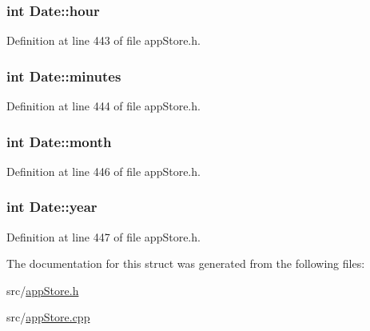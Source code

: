\hypertarget{struct_date_a59f93395dbec8ce9945f2ea091250c42}{
\subsubsection[{hour}]{\setlength{\rightskip}{0pt plus 5cm}int Date\-::hour}}\label{struct_date_a59f93395dbec8ce9945f2ea091250c42}


Definition at line 443 of file app\-Store.\-h.

\hypertarget{struct_date_a3bd2b03da68ad8995b56a393a0c4f4a0}{
\subsubsection[{minutes}]{\setlength{\rightskip}{0pt plus 5cm}int Date\-::minutes}}\label{struct_date_a3bd2b03da68ad8995b56a393a0c4f4a0}


Definition at line 444 of file app\-Store.\-h.

\hypertarget{struct_date_a533843e07c6ac8d19fee9b16f5336ba2}{
\subsubsection[{month}]{\setlength{\rightskip}{0pt plus 5cm}int Date\-::month}}\label{struct_date_a533843e07c6ac8d19fee9b16f5336ba2}


Definition at line 446 of file app\-Store.\-h.

\hypertarget{struct_date_a3eeced2ed56bc95d56782b9e738db8ea}{
\subsubsection[{year}]{\setlength{\rightskip}{0pt plus 5cm}int Date\-::year}}\label{struct_date_a3eeced2ed56bc95d56782b9e738db8ea}


Definition at line 447 of file app\-Store.\-h.



The documentation for this struct was generated from the following files\-:\begin{DoxyCompactItemize}
\item 
src/\hyperlink{app_store_8h}{app\-Store.\-h}\item 
src/\hyperlink{app_store_8cpp}{app\-Store.\-cpp}\end{DoxyCompactItemize}
